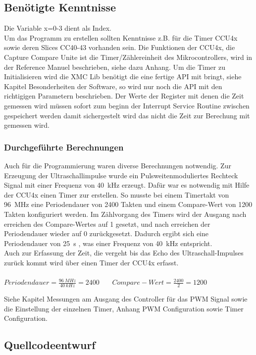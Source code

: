 \subsection{Benötigte Kenntnisse}
Die Variable x=0-3 dient als Index.\\
Um das Programm zu erstellen sollten Kenntnisse z.B. für die Timer CCU4x sowie deren Slices CC40-43 vorhanden sein. Die Funktionen der CCU4x, die Capture Compare Unite ist die Timer/Zählereinheit des Mikrocontrollers, wird in der Reference Manuel beschrieben, siehe dazu Anhang. Um die Timer zu Initialisieren wird die XMC Lib benötigt die eine fertige API mit bringt, siehe Kapitel Besonderheiten der Software, so wird nur noch die API mit den richtigigen Parametern beschrieben. Der Werte der Register mit denen die Zeit gemessen wird müssen sofort zum beginn der Interrupt Service Routine zwischen gespeichert werden damit sichergestelt wird das nicht die Zeit zur Berechung mit gemessen wird.\\

\subsubsection{Durchgeführte Berechnungen}
Auch für die Programmierung waren diverse Berechnungen notwendig. Zur Erzeugung der Ultraschallimpulse wurde ein Pulsweitenmoduliertes Rechteck Signal mit einer Frequenz von 40~kHz erzeugt. Dafür war es notwendig mit Hilfe der CCU4x einen Timer zur erstellen. So musste bei einem Timertakt von 96~MHz eine Periodendauer von 2400 Takten und einem Compare-Wert von 1200 Takten  konfiguriert werden. Im Zählvorgang des Timers wird der Ausgang nach erreichen des Compare-Wertes auf 1 gesetzt, und nach erreichen der Periodendauer wieder auf 0 zurückgesetzt. Dadurch ergibt sich eine Periodendauer von 25~\textmu s , was einer Frequenz von 40~kHz entspricht.\\
Auch zur Erfassung der Zeit, die vergeht bis das Echo des Ultraschall-Impulses zurück kommt wird über einen Timer der CCU4x erfasst. 
\onehalfspacing \\ \\
\(\displaystyle Periodendauer=\frac{96~MHz}{40~kHz} = 2400 \)  \  \  \    \(\displaystyle Compare-Wert=\frac{2400}{2} = 1200 \) 
\singlespacing

Siehe Kapitel Messungen am Ausgang des Controller für das PWM Signal sowie die Einstellung der einzelnen Timer, Anhang PWM Configuration sowie Timer Configuration.

\subsection{Quellcodeentwurf}

